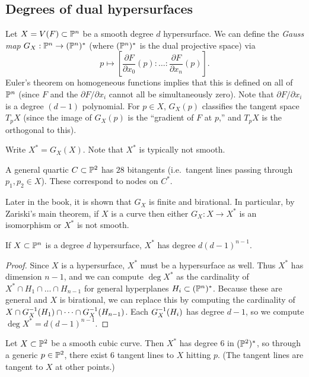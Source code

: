 \documentclass{article}
\begin{document}
\subsection{Degrees of dual hypersurfaces}

Let $X = V(F) \subset \mathbb{P}^n$ be a smooth degree $d$ hypersurface.
We can define the \emph{Gauss map} $G_X: \mathbb{P}^n \to (\mathbb{P}^n)^*$ (where $(\mathbb{P}^n)^*$ is the dual projective space) via
\[
	p \mapsto \left[ \frac{\partial F}{\partial x_0}(p) : \dots : \frac{\partial F}{\partial x_n}(p)\right].
\]
Euler's theorem on homogeneous functions implies that this is defined on all of $\mathbb{P}^n$ (since $F$ and the $\partial F / \partial x_i$ cannot all be simultaneously zero).
Note that $\partial F / \partial x_i$ is a degree $(d-1)$ polynomial.
For $p \in X$, $G_X(p)$ classifies the tangent space $T_p X$ (since the image of $G_X(p)$ is the ``gradient of $F$ at $p$,'' and $T_p X$ is the orthogonal to this).

Write $X^* = G_X(X)$.
Note that $X^*$ is typically not smooth.

\begin{ex}
	A general quartic $C \subset \mathbb{P}^2$ has $28$ bitangents (i.e.\ tangent lines passing through $p_1, p_2 \in X$).
	These correspond to nodes on $C^*$.
\end{ex}

Later in the book, it is shown that $G_X$ is finite and birational.
In particular, by Zariski's main theorem, if $X$ is a curve then either $G_X: X \to X^*$ is an isomorphism or $X^*$ is not smooth.

\begin{prop}
	If $X \subset \mathbb{P}^n$ is a degree $d$ hypersurface, $X^*$ has degree $d (d-1)^{n-1}$.
\end{prop}

\begin{proof}
	Since $X$ is a hypersurface, $X^*$ must be a hypersurface as well.
	Thus $X^*$ has dimension $n-1$, and we can compute $\deg X^*$ as the cardinality of $X^* \cap H_1 \cap \dots \cap H_{n-1}$ for general hyperplanes $H_i \subset (\mathbb{P}^n)^*$.
	Because these are general and $X$ is birational, we can replace this by computing the cardinality of $X \cap G_X^{-1}(H_1) \cap \dots \cap G_X^{-1}(H_{n-1})$.
	Each $G_X^{-1}(H_i)$ has degree $d - 1$, so we compute $\deg X^* = d (d-1)^{n-1}$.
\end{proof}

\begin{ex}
	Let $X \subset \mathbb{P}^2$ be a smooth cubic curve.
	Then $X^*$ has degree $6$ in $(\mathbb{P}^2)^*$, so through a generic $p \in \mathbb{P}^2$, there exist $6$ tangent lines to $X$ hitting $p$.
	(The tangent lines are tangent to $X$ at other points.)
\end{ex}
\end{document}
